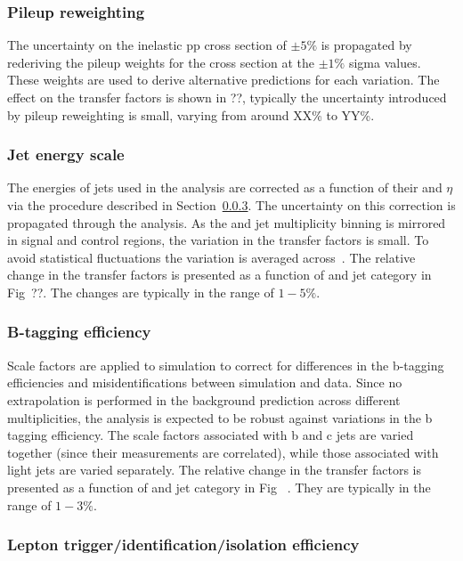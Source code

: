 \subsubsection{Pileup reweighting}

The uncertainty on the inelastic pp cross section of $\pm5\%$ is propagated by rederiving the pileup
weights for the cross section at the $\pm1\%$ sigma values. These weights are used to derive
alternative predictions for each variation. The effect on the transfer factors is shown in ??, 
typically the uncertainty introduced by pileup reweighting is small, varying from around XX\% to YY\%.

\subsubsection{Jet energy scale}
\label{sec:tfSyst_jec}
The energies of jets used in the analysis are corrected as a function of their \pt and
$\eta$ via the procedure described in Section~\ref{}. The uncertainty on
this correction is propagated through the analysis. As the \scalht and jet multiplicity binning is 
mirrored in signal and control regions, the variation in the transfer factors is small.
To avoid statistical fluctuations the variation is averaged across~\nb. The relative change 
in the transfer factors is presented as a function of \scalht and jet category 
in Fig~??. The changes are typically in the range of $1-5\%$.

\subsubsection{B-tagging efficiency}

Scale factors are applied to simulation to correct for differences in the 
b-tagging efficiencies and misidentifications between simulation and data. 
Since no extrapolation is performed in the background prediction across different 
\nb multiplicities, the analysis is expected to be robust against variations in the 
b tagging efficiency. The scale factors associated with b and c jets are varied together 
(since their measurements are correlated), while those associated with light jets are varied separately.
The relative change in the transfer factors is presented as a function of \scalht and jet category 
in Fig ~. They are typically in the range of $1-3\%$.

\subsubsection{Lepton trigger/identification/isolation efficiency}
\label{sec:tfSyst_lepton}

